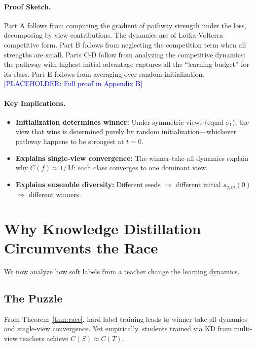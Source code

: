 \documentclass{article}
\newcommand{\placeholder}[1]{\textcolor{blue}{[PLACEHOLDER: #1]}}
\begin{document}
\paragraph{Proof Sketch.} Part A follows from computing the gradient of pathway strength under the loss, decomposing by view contributions. The dynamics are of Lotka-Volterra competitive form. Part B follows from neglecting the competition term when all strengths are small. Parts C-D follow from analyzing the competitive dynamics: the pathway with highest initial advantage captures all the ``learning budget'' for its class. Part E follows from averaging over random initialization. \placeholder{Full proof in Appendix B}

\paragraph{Key Implications.}
\begin{itemize}
    \item \textbf{Initialization determines winner:} Under symmetric views (equal $\sigma_1$), the view that wins is determined purely by random initialization---whichever pathway happens to be strongest at $t=0$.

    \item \textbf{Explains single-view convergence:} The winner-take-all dynamics explain why $C(f) \approx 1/M$: each class converges to one dominant view.

    \item \textbf{Explains ensemble diversity:} Different seeds $\Rightarrow$ different initial $s_{y,m}(0)$ $\Rightarrow$ different winners.
\end{itemize}

\section{Why Knowledge Distillation Circumvents the Race}
\label{sec:kd}

We now analyze how soft labels from a teacher change the learning dynamics.

\subsection{The Puzzle}

From Theorem~\ref{thm:race}, hard label training leads to winner-take-all dynamics and single-view convergence. Yet empirically, students trained via KD from multi-view teachers achieve $C(S) \approx C(T)$.
\end{document}
